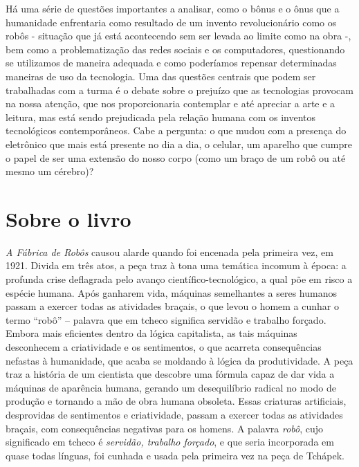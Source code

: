 \documentclass[11pt]{extarticle}
\begin{document}
Há uma série de questões importantes a analisar, como o bônus e o ônus que a humanidade enfrentaria como resultado de um invento revolucionário como os robôs - situação que já está acontecendo sem ser levada ao limite como na obra -, bem como a problematização das redes sociais e os computadores, questionando se utilizamos de maneira adequada e como poderíamos repensar determinadas maneiras de uso da tecnologia. Uma das questões centrais que podem ser trabalhadas com a turma é o debate sobre o prejuízo que as tecnologias provocam na nossa atenção, que nos proporcionaria contemplar e até apreciar a arte e a leitura, mas está sendo prejudicada pela relação humana com os inventos tecnológicos contemporâneos. Cabe a pergunta: o que mudou com a presença do eletrônico que mais está presente no dia a dia, o celular, um aparelho que cumpre o papel de ser uma extensão do nosso corpo (como um braço de um robô ou até mesmo um cérebro)? 


\section{Sobre o livro}

\textit{A Fábrica de Robôs} causou alarde quando foi encenada pela primeira vez, em 1921. Divida em três atos, a peça traz à tona uma temática incomum à época: a profunda crise deflagrada pelo avanço científico-tecnológico, a qual põe em risco a espécie humana. Após ganharem vida, máquinas semelhantes a seres humanos passam a exercer todas as atividades braçais, o que levou o homem a cunhar o termo “robô” – palavra que em tcheco significa servidão e trabalho forçado. Embora mais eficientes dentro da lógica capitalista, as tais máquinas desconhecem a criatividade e os sentimentos, o que acarreta consequências nefastas à humanidade, que acaba se moldando à lógica da produtividade. A peça traz a história de um cientista que descobre uma fórmula capaz de dar vida a máquinas de aparência humana, gerando um desequilíbrio radical no modo de produção e tornando a mão de obra humana obsoleta. Essas criaturas artificiais, desprovidas de sentimentos e criatividade, passam a exercer todas as atividades braçais, com consequências negativas para os homens. A palavra \textit{robô}, cujo significado em tcheco é \textit{servidão, trabalho forçado}, e que seria incorporada em quase todas línguas, foi cunhada e usada pela primeira vez na peça de Tchápek.
\end{document}

